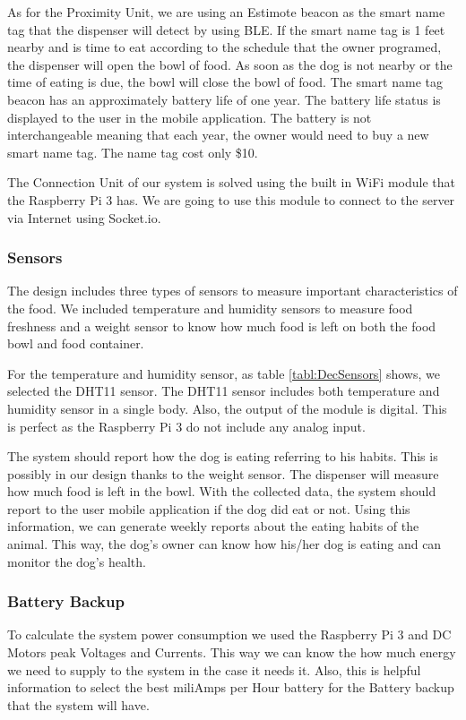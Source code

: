 \documentclass[12pt]{article}
\begin{document}
As for the Proximity Unit, we are using an Estimote\cite{K2014} beacon as the smart name tag that the dispenser will detect by using BLE. If the smart name tag is 1 feet nearby and is time to eat according to the schedule that the owner programed, the dispenser will open the bowl of food. As soon as the dog is not nearby or the time of eating is due, the bowl will close the bowl of food. The smart name tag beacon has an approximately battery life of one year. The battery life status is displayed to the user in the mobile application. The battery is not interchangeable meaning that each year, the owner would need to buy a new smart name tag. The name tag cost only \$10.

The Connection Unit of our system is solved using the built in WiFi module that the Raspberry Pi 3 has. We are going to use this module to connect to the server via Internet using Socket.io.


\subsubsection{Sensors}

The design includes three types of sensors to measure important characteristics of the food. We included temperature and humidity sensors to measure food freshness and a weight sensor to know how much food is left on both the food bowl and food container.

For the temperature and humidity sensor, as table \ref{tabl:DecSensors} shows, we selected the DHT11 sensor. The DHT11 sensor includes both temperature and humidity sensor in a single body. Also, the output of the module is digital. This is perfect as the Raspberry Pi 3 do not include any analog input.

The system should report how the dog is eating referring to his habits. This is possibly in our design thanks to the weight sensor. The dispenser will measure how much food is left in the bowl. With the collected data, the system should report to the user mobile application if the dog did eat or not. Using this information, we can generate weekly reports about the eating habits of the animal. This way, the dog's owner can know how his/her dog is eating and can monitor the dog's health.


\subsubsection{Battery Backup}

To calculate the system power consumption we used the Raspberry Pi 3 and DC Motors peak Voltages and Currents. This way we can know the how much energy we need to supply to the system in the case it needs it. Also, this is helpful information to select the best miliAmps per Hour battery for the Battery backup that the system will have.
\end{document}
